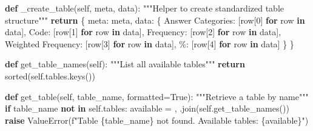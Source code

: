 \documentclass[
  11pt,
  a4paper,
]{article}
\newenvironment{Shaded}{\begin{snugshade}}{\end{snugshade}}
\newcommand{\BuiltInTok}[1]{\textcolor[rgb]{0.00,0.23,0.31}{#1}}
\newcommand{\CommentTok}[1]{\textcolor[rgb]{0.37,0.37,0.37}{#1}}
\newcommand{\ControlFlowTok}[1]{\textcolor[rgb]{0.00,0.23,0.31}{\textbf{#1}}}
\newcommand{\DecValTok}[1]{\textcolor[rgb]{0.68,0.00,0.00}{#1}}
\newcommand{\KeywordTok}[1]{\textcolor[rgb]{0.00,0.23,0.31}{\textbf{#1}}}
\newcommand{\NormalTok}[1]{\textcolor[rgb]{0.00,0.23,0.31}{#1}}
\newcommand{\OperatorTok}[1]{\textcolor[rgb]{0.37,0.37,0.37}{#1}}
\newcommand{\PreprocessorTok}[1]{\textcolor[rgb]{0.68,0.00,0.00}{#1}}
\newcommand{\SpecialCharTok}[1]{\textcolor[rgb]{0.37,0.37,0.37}{#1}}
\newcommand{\SpecialStringTok}[1]{\textcolor[rgb]{0.13,0.47,0.30}{#1}}
\newcommand{\StringTok}[1]{\textcolor[rgb]{0.13,0.47,0.30}{#1}}
\newcommand{\VariableTok}[1]{\textcolor[rgb]{0.07,0.07,0.07}{#1}}
\begin{document}
\begin{Shaded}
\begin{Highlighting}[]
    \KeywordTok{def}\NormalTok{ \_create\_table(}\VariableTok{self}\NormalTok{, meta, data):}
        \CommentTok{"""Helper to create standardized table structure"""}
        \ControlFlowTok{return}\NormalTok{ \{}
            \StringTok{\textquotesingle{}meta\textquotesingle{}}\NormalTok{: meta,}
            \StringTok{\textquotesingle{}data\textquotesingle{}}\NormalTok{: \{}
                \StringTok{\textquotesingle{}Answer Categories\textquotesingle{}}\NormalTok{: [row[}\DecValTok{0}\NormalTok{] }\ControlFlowTok{for}\NormalTok{ row }\KeywordTok{in}\NormalTok{ data],}
                \StringTok{\textquotesingle{}Code\textquotesingle{}}\NormalTok{: [row[}\DecValTok{1}\NormalTok{] }\ControlFlowTok{for}\NormalTok{ row }\KeywordTok{in}\NormalTok{ data],}
                \StringTok{\textquotesingle{}Frequency\textquotesingle{}}\NormalTok{: [row[}\DecValTok{2}\NormalTok{] }\ControlFlowTok{for}\NormalTok{ row }\KeywordTok{in}\NormalTok{ data],}
                \StringTok{\textquotesingle{}Weighted Frequency\textquotesingle{}}\NormalTok{: [row[}\DecValTok{3}\NormalTok{] }\ControlFlowTok{for}\NormalTok{ row }\KeywordTok{in}\NormalTok{ data],}
                \StringTok{\textquotesingle{}\%\textquotesingle{}}\NormalTok{: [row[}\DecValTok{4}\NormalTok{] }\ControlFlowTok{for}\NormalTok{ row }\KeywordTok{in}\NormalTok{ data]}
\NormalTok{            \}}
\NormalTok{        \}}
    
    \KeywordTok{def}\NormalTok{ get\_table\_names(}\VariableTok{self}\NormalTok{):}
        \CommentTok{"""List all available tables"""}
        \ControlFlowTok{return} \BuiltInTok{sorted}\NormalTok{(}\VariableTok{self}\NormalTok{.tables.keys())}
    
    \KeywordTok{def}\NormalTok{ get\_table(}\VariableTok{self}\NormalTok{, table\_name, formatted}\OperatorTok{=}\VariableTok{True}\NormalTok{):}
        \CommentTok{"""Retrieve a table by name"""}
        \ControlFlowTok{if}\NormalTok{ table\_name }\KeywordTok{not} \KeywordTok{in} \VariableTok{self}\NormalTok{.tables:}
\NormalTok{            available }\OperatorTok{=} \StringTok{\textquotesingle{}, \textquotesingle{}}\NormalTok{.join(}\VariableTok{self}\NormalTok{.get\_table\_names())}
            \ControlFlowTok{raise} \PreprocessorTok{ValueError}\NormalTok{(}\SpecialStringTok{f"Table \textquotesingle{}}\SpecialCharTok{\{}\NormalTok{table\_name}\SpecialCharTok{\}}\SpecialStringTok{\textquotesingle{} not found. Available tables: }\SpecialCharTok{\{}\NormalTok{available}\SpecialCharTok{\}}\SpecialStringTok{"}\NormalTok{)}
        

\end{Highlighting}
\end{Shaded}
\end{document}
